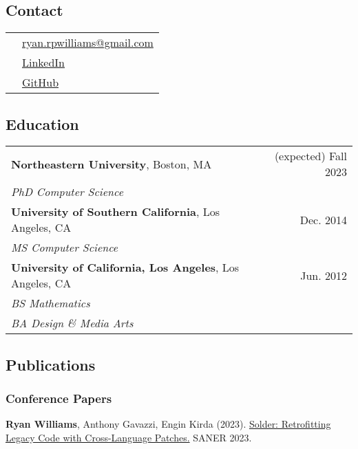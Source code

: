 \documentclass[11pt]{article}
\begin{document}

\subsection{Contact}
\label{sec:contact}

\begin{tabularx}{\textwidth}{ll}
    & \href{mailto:ryan.rpwilliams@gmail.com}{ryan.rpwilliams@gmail.com} \\
    & \href{https://www.linkedin.com/in/ryan-paul-williams}{LinkedIn} \\
    & \href{https://github.com/williamsryan}{GitHub} \\
\end{tabularx}

\subsection{Education}
\label{sec:education}

\begin{tabularx}{\textwidth}{>{\raggedright\arraybackslash}p{8cm}>{\raggedright\arraybackslash}r}
    \textbf{Northeastern University}, Boston, MA & (expected) Fall 2023 \\
    \textit{PhD Computer Science} & \\
    \textbf{University of Southern California}, Los Angeles, CA & Dec. 2014 \\
    \textit{MS Computer Science} & \\
    \textbf{University of California, Los Angeles}, Los Angeles, CA & Jun. 2012 \\
    \textit{BS Mathematics} & \\
    \textit{BA Design \& Media Arts} & \\
\end{tabularx}

\subsection{Publications}
\label{sec:publications}
\subsubsection{Conference Papers}
\textbf{Ryan Williams}, Anthony Gavazzi, Engin Kirda (2023).
\href{https://ieeexplore.ieee.org/abstract/document/10123487}{Solder: Retrofitting Legacy Code with Cross-Language Patches.}
SANER 2023.
\end{document}

